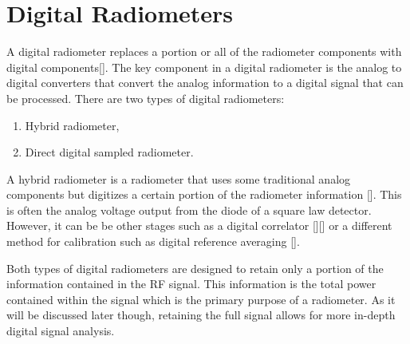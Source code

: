 \section{Digital Radiometers}

A digital radiometer replaces a portion or all of the radiometer components with digital components[\cite{Ruf}].  The key component in a digital radiometer is the analog to digital converters that convert the analog information to a digital signal that can be processed.  There are two types of digital radiometers:

\begin{enumerate}
\item Hybrid radiometer,
\item Direct digital sampled radiometer.
\end{enumerate}

A hybrid radiometer is a radiometer that uses some traditional analog components but digitizes a certain portion of the radiometer information [\cite{skou}].  This is often the analog voltage output from the diode of a square law detector.  However, it can be be other stages such as a digital correlator [\cite{villarino02}][\cite{Wang}] or a different method for calibration such as digital reference averaging [\cite{Bremer}].  

Both types of digital radiometers are designed to retain only a portion of the information contained in the RF signal.  This information is the total power contained within the signal which is the primary purpose of a radiometer.  As it will be discussed later though, retaining the full signal allows for more in-depth digital signal analysis.




